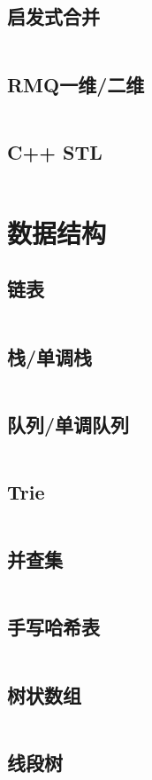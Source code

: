 \documentclass[a4paper,12pt]{article}
\begin{document}
\subsection{启发式合并}
\inputminted[breaklines]{c++}{basic/heuristic_merge.cc}
\subsection{RMQ一维/二维}
\inputminted[breaklines]{c++}{basic/rmq.cc}
\subsection{C++ STL}
\inputminted[breaklines]{md}{basic/stl.cc}

\newpage
\section{数据结构}
\subsection{链表}
\inputminted[breaklines]{c++}{ds/list.cc}
\subsection{栈/单调栈}
\inputminted[breaklines]{c++}{ds/stack.cc}
\subsection{队列/单调队列}
\inputminted[breaklines]{c++}{ds/queue.cc}
\subsection{Trie}
\inputminted[breaklines]{c++}{ds/trie.cc}
\subsection{并查集}
\inputminted[breaklines]{c++}{ds/dsu.cc}
\subsection{手写哈希表}
\inputminted[breaklines]{c++}{ds/hash.cc}
\subsection{树状数组}
\inputminted[breaklines]{c++}{ds/tree_array.cc}
\subsection{线段树}
\inputminted[breaklines]{c++}{ds/seg_tree.cc}
\end{document}

